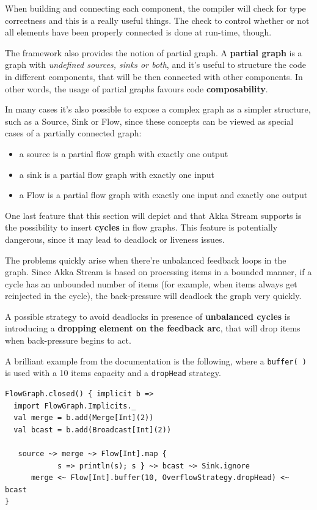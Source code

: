 When building and connecting each component, the compiler will check for
type correctness and this is a really useful things. The check to
control whether or not all elements have been properly connected is done
at run-time, though.

The framework also provides the notion of partial graph. A
\textbf{partial graph} is a graph with \emph{undefined sources, sinks or
both}, and it's useful to structure the code in different components,
that will be then connected with other components. In other words, the
usage of partial graphs favours code \textbf{composability}.

In many cases it's also possible to expose a complex graph as a simpler
structure, such as a Source, Sink or Flow, since these concepts can be
viewed as special cases of a partially connected graph:

\begin{itemize}
\itemsep1pt\parskip0pt
\item
  a source is a partial flow graph with exactly one output
\item
  a sink is a partial flow graph with exactly one input
\item
  a Flow is a partial flow graph with exactly one input and exactly one
  output
\end{itemize}

One last feature that this section will depict and that Akka Stream
supports is the possibility to insert \textbf{cycles} in flow graphs.
This feature is potentially dangerous, since it may lead to deadlock or
liveness issues.

The problems quickly arise when there're unbalanced feedback loops in
the graph. Since Akka Stream is based on processing items in a bounded
manner, if a cycle has an unbounded number of items (for example, when
items always get reinjected in the cycle), the back-pressure will
deadlock the graph very quickly.

A possible strategy to avoid deadlocks in presence of \textbf{unbalanced
cycles} is introducing a \textbf{dropping element on the feedback arc},
that will drop items when back-pressure begins to act.

A brilliant example from the documentation is the following, where a
\texttt{buffer(\ )} is used with a 10 items capacity and a
\texttt{dropHead} strategy.

\begin{verbatim}
FlowGraph.closed() { implicit b =>
  import FlowGraph.Implicits._
  val merge = b.add(Merge[Int](2))
  val bcast = b.add(Broadcast[Int](2))

￼  source ~> merge ~> Flow[Int].map { 
			s => println(s); s } ~> bcast ~> Sink.ignore
      merge <~ Flow[Int].buffer(10, OverflowStrategy.dropHead) <~ bcast
}
\end{verbatim}

